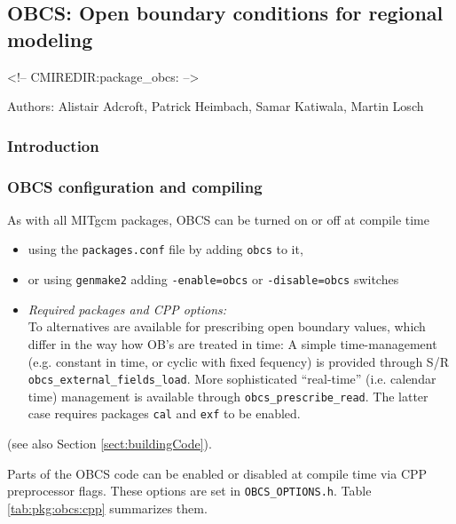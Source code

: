 \subsection{OBCS: Open boundary conditions for regional modeling}

\label{sec:pkg:obcs}
\begin{rawhtml}
<!-- CMIREDIR:package_obcs: -->
\end{rawhtml}

Authors: 
Alistair Adcroft, Patrick Heimbach, Samar Katiwala, Martin Losch

\subsubsection{Introduction
\label{sec:pkg:obcs:intro}}




\subsubsection{OBCS configuration and compiling
\label{sec:pkg:kpp:comp}}

As with all MITgcm packages, OBCS can be turned on or off 
at compile time
%
\begin{itemize}
%
\item
using the \texttt{packages.conf} file by adding \texttt{obcs} to it,
%
\item
or using \texttt{genmake2} adding
\texttt{-enable=obcs} or \texttt{-disable=obcs} switches
%
\item
\textit{Required packages and CPP options:} \\
%
To alternatives are available for prescribing open boundary values,
which differ in the way how OB's are treated in time:
A simple time-management (e.g. constant in time, or cyclic with
fixed fequency) is provided through 
S/R \texttt{obcs\_external\_fields\_load}.
More sophisticated ``real-time'' (i.e. calendar time) management is
available through \texttt{obcs\_prescribe\_read}. 
The latter case requires
packages \texttt{cal} and \texttt{exf} to be enabled.
%
\end{itemize}
(see also Section \ref{sect:buildingCode}).

Parts of the OBCS code can be enabled or disabled at compile time
via CPP preprocessor flags. These options are set in
\texttt{OBCS\_OPTIONS.h}. Table \ref{tab:pkg:obcs:cpp} summarizes them.

